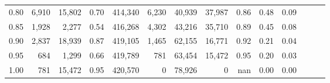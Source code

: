 \begin{tabular}{rrrrrrrrrrrrrr}
0.80 &   6,910 &  15,802 &  0.70 &  414,340 &    6,230 &  40,939 &  37,987 &  0.86 &  0.48 &      0.09 \\
0.85 &   1,928 &   2,277 &  0.54 &  416,268 &    4,302 &  43,216 &  35,710 &  0.89 &  0.45 &      0.08 \\
0.90 &   2,837 &  18,939 &  0.87 &  419,105 &    1,465 &  62,155 &  16,771 &  0.92 &  0.21 &      0.04 \\
0.95 &     684 &   1,299 &  0.66 &  419,789 &      781 &  63,454 &  15,472 &  0.95 &  0.20 &      0.03 \\
1.00 &     781 &  15,472 &  0.95 &  420,570 &        0 &  78,926 &       0 &   nan &  0.00 &      0.00 \\
\bottomrule
\end{tabular}
